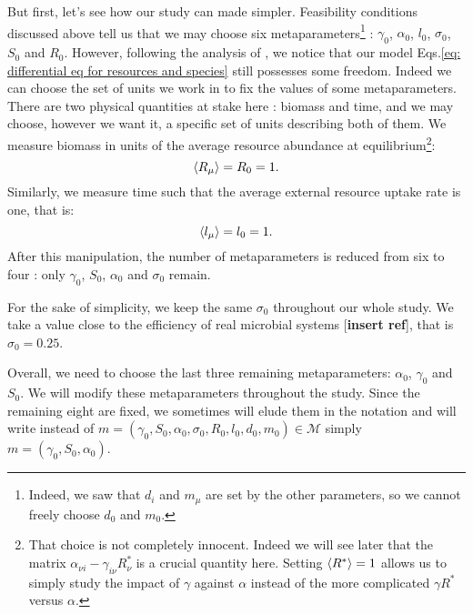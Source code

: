 \documentclass[12pt, titlepage]{report}
\begin{document}
But first, let's see how our study can made simpler. Feasibility conditions discussed above tell us that we may choose six metaparameters\footnote{Indeed, we saw that $d_i$ and $m_\mu$ are set by the other parameters, so we cannot freely choose $d_0$ and $m_0$.} : $\gamma_0$, $\alpha_0$, $l_0$, $\sigma_0$, $S_0$ and $R_0$. However, following the analysis of \cite{barbier_cavity_2017}, we notice that our model Eqs.\eqref{eq: differential eq for resources and species} still possesses some freedom. Indeed we can choose the set of units we work in to fix the values of some metaparameters. There are two physical quantities at stake here : biomass and time, and we may choose, however we want it, a specific set of units describing both of them.
We measure biomass in units of the average resource abundance at equilibrium\footnote{That choice is not completely innocent. Indeed we will see later that the matrix $\alpha_{\nu i}-\gamma_{i \nu} R^*_\nu$ is a crucial quantity here. Setting $\langle R^* \rangle=1$ allows us to simply study the impact of $\gamma$ against $\alpha$ instead of the more complicated $\gamma R^*$ versus $\alpha$.}:
\begin{equation}
 \langle R_\mu \rangle = R_0 = 1.
\end{equation}
Similarly, we measure time such that the average external resource uptake rate is one, that is:
\begin{equation}
\langle l_\mu \rangle = l_0 = 1.
\end{equation}
After this manipulation, the number of metaparameters is reduced from six to four : only $\gamma_0$, $S_0$, $\alpha_0$ and $\sigma_0$ remain.

For the sake of simplicity, we keep the same $\sigma_0$ throughout our whole study. We take a value close to the efficiency of real microbial systems [\textbf{insert ref}], that is $\sigma_0 =0.25$.

Overall, we need to choose the last three remaining metaparameters: $\alpha_0$, $\gamma_0$ and $S_0$. We will modify these metaparameters throughout the study. Since the remaining eight are fixed, we sometimes will elude them in the notation and will write instead of $m=(\gamma_0, S_0, \alpha_0, \sigma_0, R_0, l_0, d_0, m_0) \in \mathcal{M}$ simply $m=(\gamma_0, S_0, \alpha_0)$.
\end{document}
